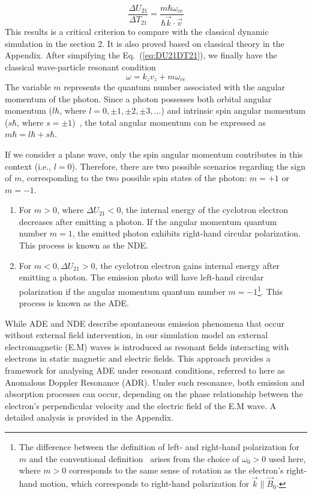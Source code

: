 \documentclass{cpbtex3}
\begin{document}
\begin{equation}
\frac{\Delta U_{21}}{\Delta T_{21}} = \frac{m \hbar \omega_{ce}}{\hbar \vec{k} \cdot \vec{v}}  \label{eq:DU21DT21}
\end{equation}
 This results is a critical criterion to compare with the classical dynamic simulation in the section 2. It is also proved based on classical theory in the Appendix.
After simpifying the Eq.~(\ref{eq:DU21DT21}), we finally have the classical wave-particle resonant condition 
\begin{equation}
\omega = k_z v_z + m \omega_{ce}
\end{equation}
The variable \( m \) represents the quantum number associated with the angular momentum of the photon. Since a photon possesses both orbital angular momentum (\( l\hbar\), where \(l = 0,\pm1,\pm2,\pm3,... \)) and intrinsic spin angular momentum (\( s\hbar \), where \( s = \pm 1 \))~\cite{arnaut2000orbital}, the total angular momentum can be expressed as \( m\hbar = l\hbar + s\hbar \). 

If we consider a plane wave, only the spin angular momentum contributes in this context (i.e., \( l = 0 \)). Therefore, there are two possible scenarios regarding the sign of \( m \), corresponding to the two possible spin states of the photon: \( m = +1 \) or \( m = -1 \).

\begin{enumerate}
\item  	For $m>0$, where $\Delta U_{21}<0$, the internal energy of the cyclotron electron decreases after emitting a photon. If the angular momentum quantum number $m =1$, the emitted photon exhibits right-hand circular polarization. This process is known as the NDE.
\item    	For $m<0, \Delta U_{21}>0$, the cyclotron electron gains internal energy after emitting a photon. The emission photo will have left-hand circular polarization if the angular momentum quantum number $m = -1$\footnote{The difference between the definition of left- and right-hand polarization for \( m \) and the conventional definition~\cite{kiang2008angular} arises from the choice of \( \omega_0 > 0 \) used here, where \( m > 0 \) corresponds to the same sense of rotation as the electron's right-hand motion, which corresponds to right-hand polarization for \( \vec{k} \parallel \vec{B}_0 \).
}. This process is known as the ADE. 
\end{enumerate}


While ADE and NDE describe spontaneous emission phenomena that occur without external field intervention, in our simulation model an external electromagnetic (E.M) waves is introduced as resonant fields interacting with electrons in static magnetic and electric fields. This approach provides a framework for analysing ADE under resonant conditions, referred to here as Anomalous Doppler Resonance (ADR). Under such resonance, both emission and absorption processes can occur, depending on the phase relationship between the electron’s perpendicular velocity and the electric field of the E.M wave. A detailed analysis is provided in the Appendix.
\end{document}

